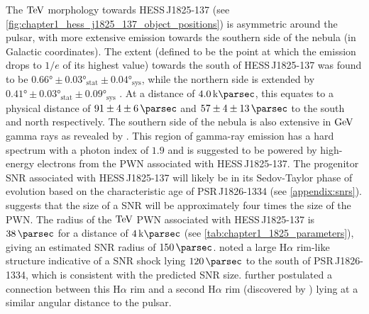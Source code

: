 \newpar
The $\TeV$ morphology towards \mbox{HESS\,J1825-137} (see \autoref{fig:chapter1_hess_j1825_137_object_positions}) is asymmetric around the pulsar, with more extensive emission towards the southern side of the nebula (in Galactic coordinates). The extent (defined to be the point at which the emission drops to $1/e$ of its highest value) towards the south of \mbox{HESS\,J1825-137} was found to be $\ang{0.66}\pm\ang{0.03}_\text{stat}\pm\ang{0.04}_\text{sys}$, while the northern side is extended by $\ang{0.41}\pm\ang{0.03}_\text{stat}\pm\ang{0.09}_\text{sys}$ \citep{2019A&A...621A.116H} . At a distance of $4.0\,\kpc$, this equates to a physical distance of $91\pm4\pm6\,\pc$ and $57\pm4\pm13\,\pc$ to the south and north respectively. The southern side of the nebula is also extensive in $\si{\giga\electronvolt}$ gamma rays as revealed by \cite{2019MNRAS.485.1001A}. This region of gamma-ray emission has a hard spectrum with a photon index of $1.9$ and is suggested to be powered by high-energy electrons from the PWN associated with \mbox{HESS\,J1825-137}.
\newpar
The progenitor SNR associated with \mbox{HESS\,J1825-137} will likely be in its Sedov-Taylor phase of evolution based on the characteristic age of \mbox{PSR\,J1826-1334} (see \autoref{appendix:snrs}). \cite{2001A&A...380..309V} suggests that the size of a SNR will be approximately four times the size of the PWN. The radius of the $\TeV$ PWN associated with \mbox{HESS\,J1825-137} is $38\,\pc$ for a distance of $4\,\kpc$ (see \autoref{tab:chapter1_1825_parameters}), giving an estimated SNR radius of $150\,\pc$. \cite{2016MNRAS.458.2813V} noted a large H$\alpha$ rim-like structure indicative of a SNR shock lying $120\,\pc$ to the south of \mbox{PSR\,J1826-1334}, which is consistent with the predicted SNR size. \cite{2016MNRAS.458.2813V} further postulated a connection between this H$\alpha$ rim and a second H$\alpha$ rim (discovered by \cite{2008MNRAS.390.1037S}) lying at a similar angular distance to the pulsar.


